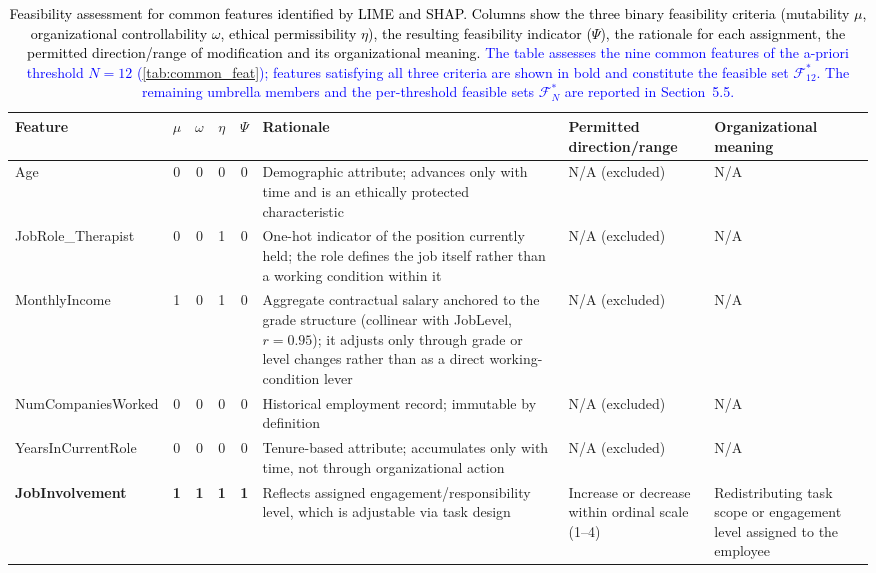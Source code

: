 \documentclass[a4paper,fleqn]{cas-sc}
\begin{document}
\begin{table}[width=1\linewidth, pos=H]
\centering
\caption{\textcolor{black}{Feasibility assessment for common features identified by LIME and SHAP. Columns show the three binary feasibility criteria (mutability $\mu$, organizational controllability $\omega$, ethical permissibility $\eta$), the resulting feasibility indicator ($\Psi$), the rationale for each assignment, the permitted direction/range of modification and its organizational meaning. \textcolor{blue}{The table assesses the nine common features of the a-priori threshold $N = 12$ (\cref{tab:common_feat}); features satisfying all three criteria are shown in bold and constitute the feasible set $\mathcal{F}^*_{12}$. The remaining umbrella members and the per-threshold feasible sets $\mathcal{F}^*_N$ are reported in Section~5.5.}}}
\label{tab:feasibility_complete}
\begin{tabular}{p{3cm}ccccp{3.25cm}p{2.7cm}p{3.25cm}}
\toprule
\textbf{Feature} & $\mu$ & $\omega$ & $\eta$ & $\Psi$ & \textbf{Rationale} & \textbf{Permitted direction/range} & \textbf{Organizational meaning} \\
\midrule
Age & 0 & 0 & 0 & 0 &
Demographic attribute; advances only with time and is an ethically protected characteristic &
N/A (excluded) & N/A \\
\midrule
JobRole\_Therapist & 0 & 0 & 1 & 0 &
One-hot indicator of the position currently held; the role defines the job itself rather than a working condition within it &
N/A (excluded) & N/A \\
\midrule
MonthlyIncome & 1 & 0 & 1 & 0 &
Aggregate contractual salary anchored to the grade structure (collinear with JobLevel, $r = 0.95$); it adjusts only through grade or level changes rather than as a direct working-condition lever &
N/A (excluded) & N/A \\
\midrule
NumCompaniesWorked & 0 & 0 & 0 & 0 &
Historical employment record; immutable by definition &
N/A (excluded) & N/A \\
\midrule
YearsInCurrentRole & 0 & 0 & 0 & 0 &
Tenure-based attribute; accumulates only with time, not through organizational action &
N/A (excluded) & N/A \\
\midrule
\textbf{JobInvolvement} & \textbf{1} & \textbf{1} & \textbf{1} & \textbf{1} &
Reflects assigned engagement/responsibility level, which is adjustable via task design &
Increase or decrease within ordinal scale (1--4) &
Redistributing task scope or engagement level assigned to the employee \\
\midrule

\end{tabular}
\end{table}
\end{document}
